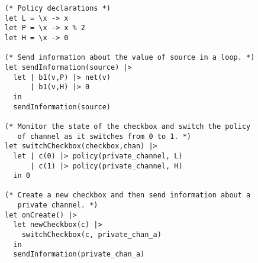 \begin{verbatim}
(* Policy declarations *)
let L = \x -> x
let P = \x -> x % 2
let H = \x -> 0

(* Send information about the value of source in a loop. *)
let sendInformation(source) |>
  let | b1(v,P) |> net(v)
      | b1(v,H) |> 0
  in
  sendInformation(source)

(* Monitor the state of the checkbox and switch the policy 
   of channel as it switches from 0 to 1. *)
let switchCheckbox(checkbox,chan) |>
  let | c(0) |> policy(private_channel, L)
      | c(1) |> policy(private_channel, H)
  in 0

(* Create a new checkbox and then send information about a 
   private channel. *)
let onCreate() |>
  let newCheckbox(c) |>
    switchCheckbox(c, private_chan_a)
  in
  sendInformation(private_chan_a)
\end{verbatim}
